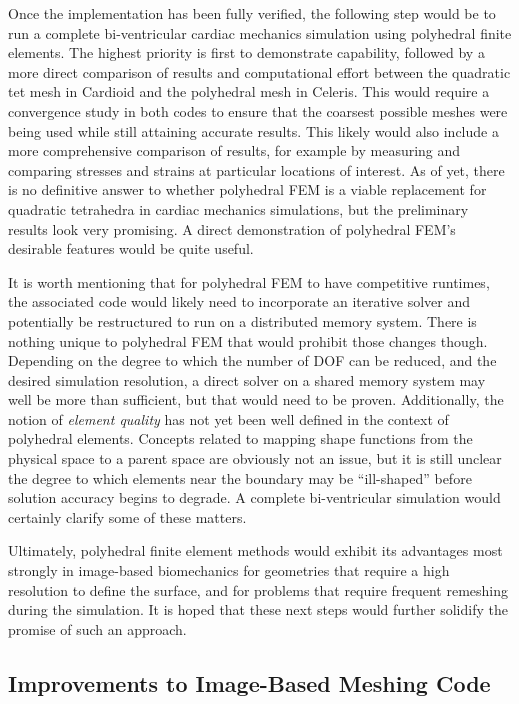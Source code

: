 Once the implementation has been fully verified, the following step would be to run a complete bi-ventricular cardiac mechanics simulation using polyhedral finite elements. The highest priority is first to demonstrate capability, followed by a more direct comparison of results and computational effort between the quadratic tet mesh in Cardioid and the polyhedral mesh in Celeris. This would require a convergence study in both codes to ensure that the coarsest possible meshes were being used while still attaining accurate results. This likely would also include a more comprehensive comparison of results, for example by measuring and comparing stresses and strains at particular locations of interest. As of yet, there is no definitive answer to whether polyhedral FEM is a viable replacement for quadratic tetrahedra in cardiac mechanics simulations, but the preliminary results look very promising. A direct demonstration of polyhedral FEM's desirable features would be quite useful.

It is worth mentioning that for polyhedral FEM to have competitive runtimes, the associated code would likely need to incorporate an iterative solver and potentially be restructured to run on a distributed memory system. There is nothing unique to polyhedral FEM that would prohibit those changes though. Depending on the degree to which the number of DOF can be reduced, and the desired simulation resolution, a direct solver on a shared memory system may well be more than sufficient, but that would need to be proven. Additionally, the notion of \textit{element quality} has not yet been well defined in the context of polyhedral elements. Concepts related to mapping shape functions from the physical space to a parent space are obviously not an issue, but it is still unclear the degree to which elements near the boundary may be ``ill-shaped'' before solution accuracy begins to degrade. A complete bi-ventricular simulation would certainly clarify some of these matters.

Ultimately, polyhedral finite element methods would exhibit its advantages most strongly in image-based biomechanics for geometries that require a high resolution to define the surface, and for problems that require frequent remeshing during the simulation. It is hoped that these next steps would further solidify the promise of such an approach.

\subsection{Improvements to Image-Based Meshing Code}
\label{Improvements to Image-Based Meshing Code}

